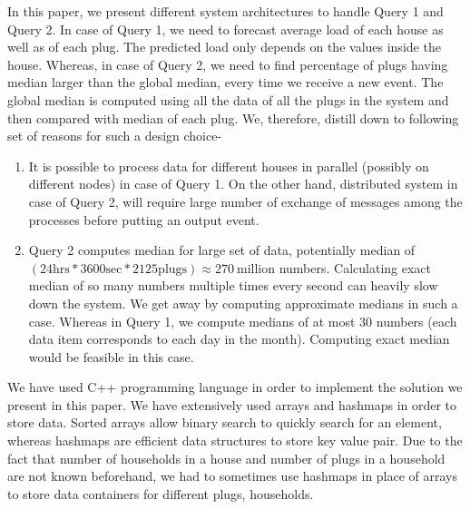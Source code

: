 In this paper, we present different system architectures to handle Query 1 and Query 2. In case of Query 1, we need to forecast average load of each house as well as of each plug. The predicted load only depends on the values inside the house. Whereas, in case of Query 2, we need to find percentage of plugs having median larger than the global median, every time we receive a new event. The global median is computed using all the data of all the plugs in the system and then compared with median of each plug. We, therefore, distill down to following set of reasons for such a design choice-

\begin{enumerate}
\item It is possible to process data for different houses in parallel (possibly on different nodes) in case of Query 1. On the other hand, distributed system in case of Query 2, will require large number of exchange of messages among the processes before putting an output event.
\item Query 2 computes median for large set of data, potentially median of $(24 \mbox{hrs} * 3600 \mbox{sec} * 2125 \mbox{plugs}) \approx 270 \ \mbox{million}$ numbers. Calculating exact median of so many numbers multiple times every second can heavily slow down the system. We get away by computing approximate medians in such a case. Whereas in Query 1, we compute medians of at most 30 numbers (each data item corresponds to each day in the month). Computing exact median would be feasible in this case.
\end{enumerate}

We have used C++ programming language in order to implement the solution we present in this paper. We have extensively used arrays and hashmaps in order to store data. Sorted arrays allow binary search to quickly search for an element, whereas hashmaps are efficient data structures to store key value pair. Due to the fact that number of households in a house and number of plugs in a household are not known beforehand, we had to sometimes use hashmaps in place of arrays to store data containers for different plugs, households.
